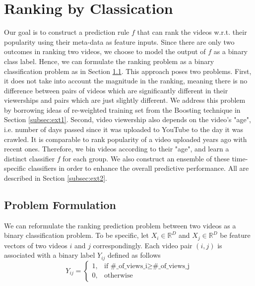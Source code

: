 \section{Ranking by Classication}
\label{sec:ranking}	
	Our goal is to construct a prediction rule $f$ that can rank the videos w.r.t. their popularity using their meta-data as feature inputs. Since there are only two outcomes in ranking two videos, we choose to model the output of $f$ as a binary class label. Hence, we can formulate the ranking problem as a binary classification problem as in Section \ref{subsec:probFormulation}. This approach poses two problems. First, it does not take into account the magnitude in the ranking, meaning there is no difference between pairs of videos which are significantly different in their viewerships and pairs which are just slightly different. We address this problem by borrowing ideas of re-weighted training set from the Boosting technique in Section \ref{subsec:ext1}. Second, video viewership also depends on the video's "age", i.e. number of days passed since it was uploaded to YouTube to the day it was crawled. It is comparable to rank popularity of a video uploaded years ago with recent ones. Therefore, we bin videos according to their "age", and learn a distinct classifier $f$ for each group. We also construct an ensemble of these time-specific classifiers in order to enhance the overall predictive performance. All are described in Section \ref{subsec:ext2}.

\subsection{Problem Formulation}
\label{subsec:probFormulation}
We can reformulate the ranking prediction problem between two videos as a binary classification problem. To be specific, let $X_i \in \mathbb{R}^D$ and $X_j \in \mathbb{R}^D$ be feature vectors of two videos $i$ and $j$ correspondingly. Each video pair $(i, j)$ is associated with a binary label $Y_{ij}$ defined as follows
\begin{equation}
	Y_{ij} = \begin{cases}
			   1, & \text{if } \text{\#\_of\_views\_i} \geq \text{\#\_of\_views\_j} \\
			   0, & \text{otherwise}
			\end{cases} 
	\label{eqn:binaryLabel}			
\end{equation}	

